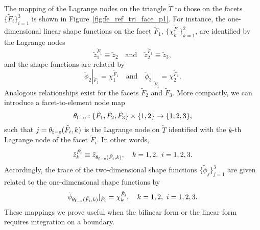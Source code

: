 The mapping of the Lagrange nodes on the triangle $\tilde T$ to those on the facets $\{ \tilde F_i \}_{i=1}^3$ is shown in Figure~\ref{fig:fe_ref_tri_face_p1}. For instance, the one-dimensional linear shape functions on the facet $\tilde F_1$, $\{ \chi_k^{\tilde F_1} \}_{k=1}^2$, are identified by the Lagrange nodes
\begin{equation*}
  \tilde z_1^{\tilde F_1} \equiv \tilde z_2 \quad \text{and} \quad
  \tilde z_2^{\tilde F_1} \equiv \tilde z_3 ,
\end{equation*}
and the shape functions are related by
\begin{equation*}
  \tilde \phi_2 |_{\tilde F_1} = \chi_1^{\tilde F_1}
  \quad \text{and} \quad
  \tilde \phi_3 |_{\tilde F_1} = \chi_2^{\tilde F_1} .
\end{equation*}
Analogous relationships exist for the facets $\tilde F_2$ and $\tilde F_3$. 
More compactly, we can introduce a facet-to-element node map
\begin{equation*}
  \theta_{\rm f-e} : \{\tilde F_1, \tilde F_2, \tilde F_3 \} \times \{1,2\} \to \{1,2,3\},
\end{equation*}
such that $j = \theta_{\rm f-e}(\tilde F_i,k)$ is the Lagrange node on $\tilde T$ identified with the $k$-th Lagrange node of the facet $\tilde F_i$. In other words,
\begin{equation*}
  \tilde z_k^{\tilde F_i} \equiv \tilde z_{\theta_{\rm f-e}(\tilde F_i,k)}, \quad k = 1,2, \ i = 1,2,3.
\end{equation*}
Accordingly, the trace of the two-dimensional shape functions $\{\tilde \phi_j\}_{j=1}^3$ are given related to the one-dimensional shape functions by
\begin{equation*}
  \tilde \phi_{\theta_{\rm f-e}(\tilde F_i,k)}|_{\tilde F_i} = \chi^{\tilde F_i}_k, \quad k = 1,2, \ i = 1,2,3.
\end{equation*}
These mappings we prove useful when the bilinear form or the linear form requires integration on a boundary.
  
